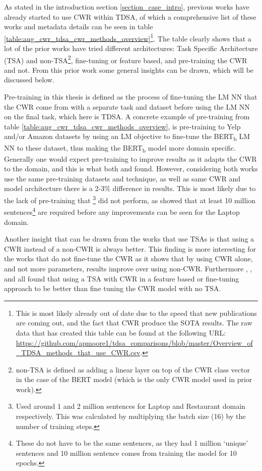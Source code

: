 As stated in the introduction section \ref{section_case_intro}, previous works have already started to use CWR within TDSA, of which a comprehensive list of these works and metadata details can be seen in table \ref{table:aug_cwr_tdsa_cwr_methods_overview}\footnote{This is most likely already out of date due to the speed that new publications are coming out, and the fact that CWR produce the SOTA results. The raw data that has created this table can be found at the following URL: \url{https://github.com/apmoore1/tdsa_comparisons/blob/master/Overview_of_TDSA_methods_that_use_CWR.csv}.}. The table clearly shows that a lot of the prior works have tried different architectures: Task Specific Architecture (TSA) and non-TSA\footnote{non-TSA is defined as adding a linear layer on top of the CWR class vector in the case of the BERT model (which is the only CWR model used in prior work).}, fine-tuning or feature based, and pre-training the CWR and not. From this prior work some general insights can be drawn, which will be discussed below.

Pre-training in this thesis is defined as the process of fine-tuning the LM NN that the CWR come from with a separate task and dataset before using the LM NN on the final task, which here is TDSA. A concrete example of pre-training from table \ref{table:aug_cwr_tdsa_cwr_methods_overview}, is pre-training to Yelp and/or Amazon datasets by using an LM objective to fine-tune the BERT\textsubscript{b} LM NN to these dataset, thus making the BERT\textsubscript{b} model more domain specific. Generally one would expect pre-training to improve results as it adapts the CWR to the domain, and this is what both \citet{rietzler2019adapt} and \citet{xu-etal-2019-bert} found. However, considering both works use the same pre-training datasets and technique, as well as same CWR and model architecture there is a 2-3\% difference in results. This is most likely due to the lack of pre-training that \citet{xu-etal-2019-bert}\footnote{Used around 1 and 2 million sentences for Laptop and Restaurant domain respectively. This was calculated by multiplying the batch size (16) by the number of training steps.} did not perform, as \citet{rietzler2019adapt} showed that at least 10 million sentences\footnote{These do not have to be the same sentences, as they had 1 million `unique' sentences and 10 million sentence comes from training the model for 10 epochs.} are required before any improvements can be seen for the Laptop domain.

Another insight that can be drawn from the works that use TSAs \citep{zeng2019lcf,zhao2019modeling,song2019attentional,huang-carley-2019-syntax, jiang-etal-2019-challenge} is that using a CWR instead of a non-CWR is always better. This finding is more interesting for the works that do not fine-tune the CWR \citep{zhao2019modeling, huang-carley-2019-syntax} as it shows that by using CWR alone, and not more parameters, results improve over using non-CWR. Furthermore \citet{song2019attentional}, \citet{jiang-etal-2019-challenge}, and \citet{huang-carley-2019-syntax} all found that using a TSA with CWR in a feature based or fine-tuning approach to be better than fine tuning the CWR model with no TSA.

